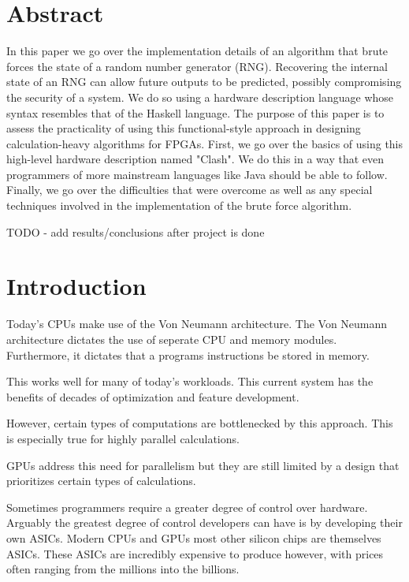 \documentclass{article}
\begin{document}
    \begin{multicols}{2}

    \section*{Abstract}

    In this paper we go over the implementation details of an algorithm that brute forces
    the state of a random number generator (RNG). Recovering the internal state of an RNG can allow
    future outputs to be predicted, possibly compromising the security of a system.
    We do so using a hardware description language whose syntax
    resembles that of the Haskell language.
    The purpose of this paper is to assess the practicality of using this functional-style approach in
    designing calculation-heavy algorithms for FPGAs.
    First, we go over the basics of using this high-level hardware description named "Clash".
    We do this in a way that even programmers of more mainstream languages like Java should be able to follow.
    Finally, we go over the difficulties that were overcome as well as any special techniques involved in
    the implementation of the brute force algorithm.

    TODO - add results/conclusions after project is done

    \section{Introduction}

    Today's CPUs make use of the Von Neumann architecture. The Von Neumann architecture dictates the use
    of seperate CPU and memory modules. Furthermore, it dictates that a programs instructions be stored
    in memory.

    This works well for many of today's workloads. This current system has the benefits of decades of optimization
    and feature development.

    However, certain types of computations are bottlenecked by this approach. This is especially true for
    highly parallel calculations.

    GPUs address this need for parallelism but they are still limited by a design that prioritizes
    certain types of calculations.

    Sometimes programmers require a greater degree of control over hardware. Arguably the greatest degree
    of control developers can have is by developing their own ASICs. Modern CPUs and GPUs most
    other silicon chips are themselves ASICs. These ASICs are incredibly expensive to produce however,
    with prices often ranging from the millions into the billions.


\end{multicols}
\end{document}

